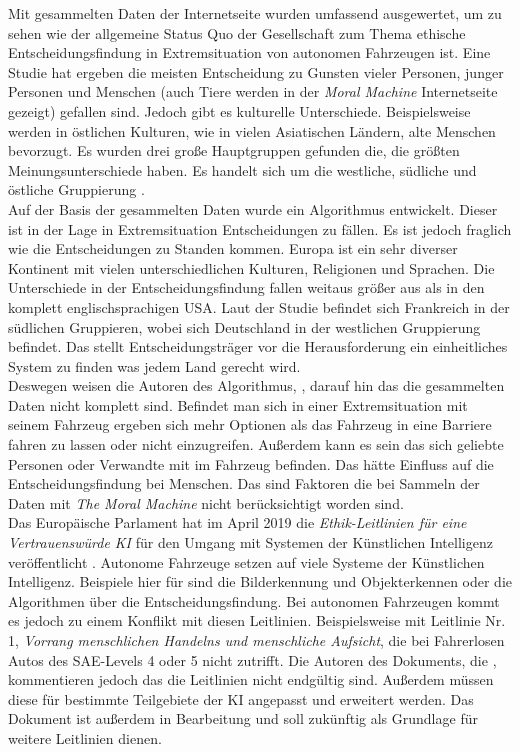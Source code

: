 Mit gesammelten Daten der Internetseite wurden umfassend ausgewertet, um zu sehen wie der allgemeine Status Quo der Gesellschaft zum Thema ethische Entscheidungsfindung in Extremsituation von autonomen Fahrzeugen ist. Eine Studie hat ergeben die meisten Entscheidung zu Gunsten vieler Personen, junger Personen und Menschen (auch Tiere werden in der \textit{Moral Machine} Internetseite gezeigt) gefallen sind. Jedoch gibt es kulturelle Unterschiede. Beispielsweise werden in östlichen Kulturen, wie in vielen Asiatischen Ländern, alte Menschen bevorzugt. Es wurden drei große Hauptgruppen gefunden die, die größten Meinungsunterschiede haben. Es handelt sich um die westliche, südliche und östliche Gruppierung \cite{moralMachine}.\\


Auf der Basis der gesammelten Daten wurde ein Algorithmus \cite{votingBasedSystem} entwickelt. Dieser ist in der Lage in Extremsituation Entscheidungen zu fällen. Es ist jedoch fraglich wie die Entscheidungen zu Standen kommen. Europa ist ein sehr diverser Kontinent mit vielen unterschiedlichen Kulturen, Religionen und Sprachen. Die Unterschiede in der Entscheidungsfindung fallen weitaus größer aus als in den komplett englischsprachigen USA. Laut der Studie befindet sich Frankreich in der südlichen Gruppieren, wobei sich Deutschland in der westlichen Gruppierung befindet. Das stellt Entscheidungsträger vor die Herausforderung ein einheitliches System zu finden was jedem Land gerecht wird.\\

Deswegen weisen die Autoren des Algorithmus, \citeauthor{votingBasedSystem}, darauf hin das die gesammelten Daten nicht komplett sind. Befindet man sich in einer Extremsituation mit seinem Fahrzeug ergeben sich mehr Optionen als das Fahrzeug in eine Barriere fahren zu lassen oder nicht einzugreifen. Außerdem kann es sein das sich geliebte Personen oder Verwandte mit im Fahrzeug befinden. Das hätte Einfluss auf die Entscheidungsfindung bei Menschen. Das sind Faktoren die bei Sammeln der Daten mit \textit{The Moral Machine} nicht berücksichtigt worden sind.\\

Das Europäische Parlament hat im April 2019 die \textit{Ethik-Leitlinien für eine Vertrauenswürde KI} für den Umgang mit Systemen der Künstlichen Intelligenz veröffentlicht \cite{ec2019ethics}. Autonome Fahrzeuge setzen auf viele Systeme der Künstlichen Intelligenz. Beispiele hier für sind die Bilderkennung und Objekterkennen oder die Algorithmen über die Entscheidungsfindung. Bei autonomen Fahrzeugen kommt es jedoch zu einem Konflikt mit diesen Leitlinien. Beispielsweise mit Leitlinie Nr. 1, \textit{Vorrang menschlichen Handelns und menschliche Aufsicht}, die bei Fahrerlosen Autos des SAE-Levels 4 oder 5 nicht zutrifft. Die Autoren des Dokuments, die \citeauthor{ec2019ethics}, kommentieren jedoch das die Leitlinien nicht endgültig sind. Außerdem müssen diese für bestimmte Teilgebiete der KI angepasst und erweitert werden. Das Dokument ist außerdem in Bearbeitung und soll zukünftig als Grundlage für weitere Leitlinien dienen.\\